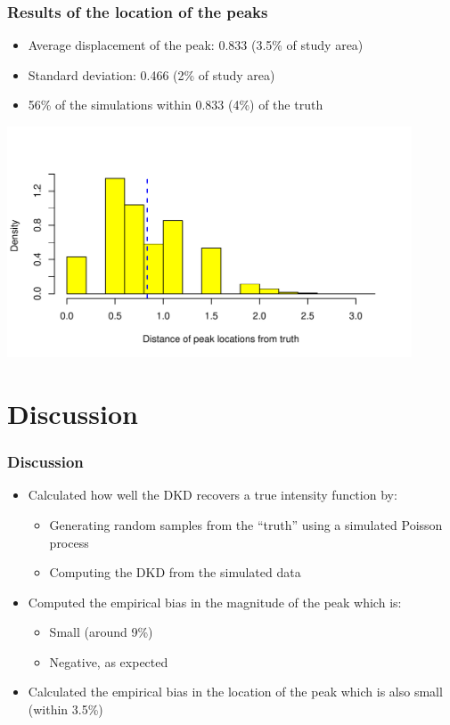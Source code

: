 \documentclass{beamer}
\begin{document}
\begin{frame}\frametitle{Results of the location of the peaks}
    \begin{itemize}
        \item Average displacement of the peak: 0.833 (3.5\% of study area)
        \item Standard deviation:  0.466 (2\% of study area)
        \item 56\% of the simulations within 0.833 (4\%) of the truth
    \end{itemize}
    \begin{example}
    \centerline{
        \label{fig:peaks-loations-hist}
        \centering
        \includegraphics[width=0.9\textwidth]{peaks-hist-locations}
     }
    \end{example}
\end{frame}

\section{Discussion}

\begin{frame}\frametitle{Discussion}
    \begin{itemize}
        \item Calculated how well the DKD recovers a true intensity function by:
        \begin{itemize}
            \item Generating random samples from the ``truth'' using a simulated Poisson process
            \item Computing the DKD from the simulated data
        \end{itemize}
        \item Computed the empirical bias in the magnitude of the peak which is:
        \begin{itemize}
            \item Small (around 9\%)
            \item Negative, as expected
        \end{itemize}        
        \item Calculated the empirical bias in the location of the peak which is also small (within 3.5\%)
    \end{itemize}
\end{frame}
\end{document}
